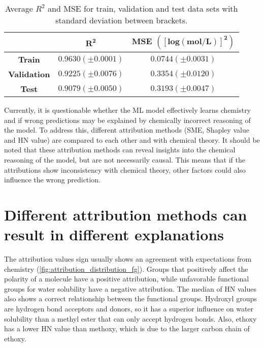 \begin{table}[h]
    \centering
    \caption{Average $R^2$ and MSE for train, validation and test data sets with standard deviation between brackets.}
    \label{tab:model_performance}
    \begin{tabular}{ccc}
        \toprule 
       & $\pmb{R^2}$ & \textbf{MSE $\pmb{\left(\left[log(mol/L)\right]^2\right)}$} \\
        \midrule
        \textbf{Train} & $0.9630 (\pm 0.0001)$ & $0.0744 (\pm 0.0031)$ \\
        \textbf{Validation} & $0.9225 (\pm 0.0076)$ & $0.3354 (\pm 0.0120)$ \\
        \textbf{Test} & $0.9079 (\pm 0.0050)$ & $0.3193 (\pm 0.0047)$ \\
        \bottomrule 
    \end{tabular}
\end{table}



Currently, it is questionable whether the ML model effectively learns chemistry and 
if wrong predictions may be explained by chemically incorrect reasoning of the model. 
To address this, different attribution methods (SME, Shapley value and HN value) are 
compared to each other and with chemical theory. It should be noted that these attribution 
methods can reveal insights into the chemical reasoning of the model, but are not necessarily 
causal. This means that if the attributions show inconsistency with chemical theory, other 
factors could also influence the wrong prediction.


\section{Different attribution methods can result in different explanations}


The attribution values sign usually shows an agreement with expectations from 
chemistry (\cref{fig:attribution_distribution_fg}). Groups that positively affect the polarity of a molecule have a 
positive attribution, while unfavorable functional groups for water solubility 
have a negative attribution. The median of HN values also shows a correct 
relationship between the functional groups. Hydroxyl groups are hydrogen bond 
acceptors and donors, so it has a superior influence on water solubility than 
a methyl ester that can only accept hydrogen bonds. Also, ethoxy has a lower 
HN value than methoxy, which is due to the larger carbon chain of ethoxy.


